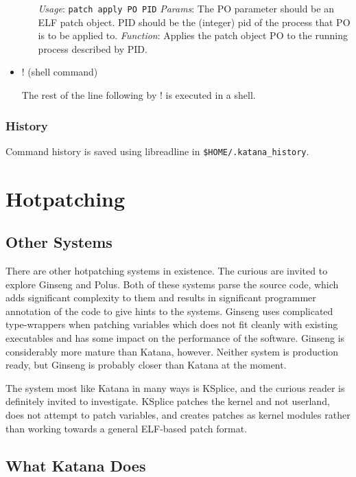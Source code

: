 \documentclass[11pt]{article}
\begin{document}
\begin{itemize}
\begin{itemize}
      \emph{Usage}: \texttt{patch apply PO PID}
      \emph{Params}: The PO parameter should be an ELF patch object. PID
                should be the (integer) pid of the process that PO is
                to be applied to.
      \emph{Function}: Applies the patch object PO to the running process
                  described by PID.
\end{itemize} %

\item ! (shell command)\\
\label{sec-2.1.2.9}

     The rest of the line following by ! is executed in a shell.
\end{itemize} %
\subsubsection{History}
\label{sec-2.1.3}

    Command history is saved using libreadline in \texttt{\$HOME/.katana\_history}.
\section{Hotpatching}
\label{sec-3}

\subsection{Other Systems}
\label{sec-3.1}

   There are other hotpatching systems in existence. The curious are
   invited to explore Ginseng and Polus. Both of these systems parse
   the source code, which adds significant complexity to them and
   results in significant programmer annotation of the code to give
   hints to the systems. Ginseng uses complicated type-wrappers
   when patching variables which does not fit cleanly with existing
   executables and has some impact on the performance of the
   software. Ginseng is considerably more mature than Katana,
   however. Neither system is production ready, but Ginseng is probably
   closer than Katana at the moment.

   The system most like Katana in many ways is KSplice, and the curious
   reader is definitely invited to investigate. KSplice patches the
   kernel and not userland, does not attempt to patch variables, and
   creates patches as kernel modules rather than working towards a
   general ELF-based patch format.
\subsection{What Katana Does}
\label{sec-3.2}
\end{document}
